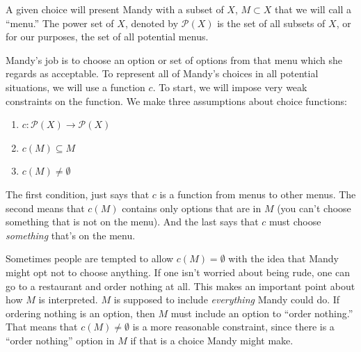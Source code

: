 A given choice will present Mandy with a subset of $X$, $M \subset X$ that we will call a ``menu.''   The power set of $X$, denoted by $\mathscr{P}(X)$ is the set of all subsets of $X$, or for our purposes, the set of all potential menus.


Mandy's job is to choose an option or set of options from that menu which she regards as acceptable.  To represent all of Mandy's choices in all potential situations, we will use a function $c$.  To start, we will impose very weak constraints on the function.  We make three assumptions about choice functions:
\begin{enumerate}
    \item $c: \mathscr{P}(X) \to \mathscr{P}(X)$
    \item $c(M) \subseteq M$
    \item $c(M) \ne \emptyset$
\end{enumerate}
The first condition, just says that $c$ is a function from menus to other menus.  The second means that $c(M)$ contains only options that are in $M$ (you can't choose something that is not on the menu).  And the last says that $c$ must choose {\it something} that's on the menu.


Sometimes people are tempted to allow $c(M) = \emptyset$ with the idea that Mandy might opt not to choose anything. If one isn't worried about being rude, one can go to a restaurant and order nothing at all.  This makes an important point about how $M$ is interpreted. $M$ is supposed to include {\it everything} Mandy could do.  If ordering nothing is an option, then $M$ must include an option to ``order nothing.''  That means that $c(M) \ne \emptyset$ is a more reasonable constraint, since there is a ``order nothing'' option in $M$ if that is a choice Mandy might make.  

